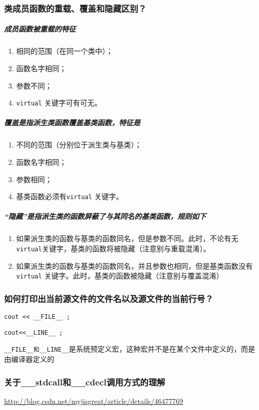 \documentclass[UTF8,a4paper,8pt]{ctexart}
\begin{document}
		\subsubsection{类成员函数的重载、覆盖和隐藏区别？}
			\subparagraph{成员函数被重载的特征}
				\begin{enumerate}
					\item 相同的范围（在同一个类中）；
					\item 函数名字相同；
					\item 参数不同；
					\item \verb|virtual| 关键字可有可无。
				\end{enumerate}
			\subparagraph{覆盖是指派生类函数覆盖基类函数，特征是}
				\begin{enumerate}
					\item 不同的范围（分别位于派生类与基类）；
					\item 函数名字相同；
					\item 参数相同；
					\item 基类函数必须有\verb|virtual| 关键字。
				\end{enumerate}
			
			\subparagraph{“隐藏”是指派生类的函数屏蔽了与其同名的基类函数，规则如下}
				\begin{enumerate}
					\item 如果派生类的函数与基类的函数同名，但是参数不同。此时，不论有无\verb|virtual|关键字，基类的函数将被隐藏（注意别与重载混淆）。
					\item 如果派生类的函数与基类的函数同名，并且参数也相同，但是基类函数没有\verb|virtual| 关键字。此时，基类的函数被隐藏（注意别与覆盖混淆）
				\end{enumerate}
			
		\subsubsection{如何打印出当前源文件的文件名以及源文件的当前行号？}
				\verb|cout << __FILE__ ;|
				
				\verb|cout<<__LINE__ ;|
				
				\verb|__FILE__和__LINE__|是系统预定义宏，这种宏并不是在某个文件中定义的，而是由编译器定义的
				
		\subsubsection{关于\_\_stdcall和\_\_cdecl调用方式的理解}
			\url{http://blog.csdn.net/myjisgreat/article/details/46477769}
			
\end{document}
